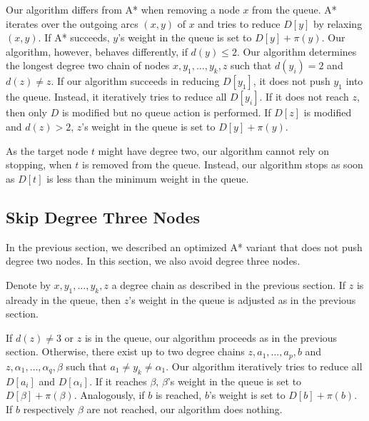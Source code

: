 \documentclass[letterpaper]{article} %
\begin{document}
Our algorithm differs from A* when removing a node $x$ from the queue.
A* iterates over the outgoing arcs $(x,y)$ of $x$ and tries to reduce $D[y]$ by relaxing $(x,y)$.
If A* succeeds, $y$'s weight in the queue is set to $D[y]+\pi(y)$.
Our algorithm, however, behaves differently, if $d(y)\le 2$.
Our algorithm determines the longest degree two chain of nodes $x,y_1,\ldots, y_k, z$ such that $d(y_i)=2$ and $d(z)\neq z$.
If our algorithm succeeds in reducing $D[y_1]$, it does not push $y_1$ into the queue.
Instead, it iteratively tries to reduce all $D[y_i]$.
If it does not reach $z$, then only $D$ is modified but no queue action is performed.
If $D[z]$ is modified and $d(z)>2$, $z$'s weight in the queue is set to $D[y]+\pi(y)$.

As the target node $t$ might have degree two, our algorithm cannot rely on stopping, when $t$ is removed from the queue.
Instead, our algorithm stops as soon as $D[t]$ is less than the minimum weight in the queue.

\subsection{Skip Degree Three Nodes}






In the previous section, we described an optimized A* variant that does not push degree two nodes.
In this section, we also avoid degree three nodes.

Denote by $x,y_1,\ldots, y_k, z$ a degree chain as described in the previous section.
If $z$ is already in the queue, then $z$'s weight in the queue is adjusted as in the previous section.

If $d(z)\neq 3$ or $z$ is in the queue, our algorithm proceeds as in the previous section.
Otherwise, there exist up to two degree chains $z,a_1,\ldots,a_p,b$ and $z,\alpha_1,\ldots,\alpha_q,\beta$ such that $a_1\neq y_k \neq \alpha_1$.
Our algorithm iteratively tries to reduce all $D[a_i]$ and $D[\alpha_i]$.
If it reaches $\beta$, $\beta$'s weight in the queue is set to $D[\beta]+\pi(\beta)$.
Analogously, if $b$ is reached, $b$'s weight is set to $D[b]+\pi(b)$.
If $b$ respectively $\beta$ are not reached, our algorithm does nothing.
\end{document}
